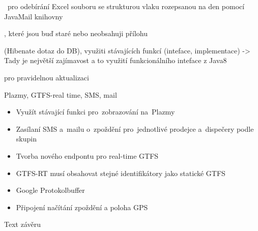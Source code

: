 	
	
~pro odebírání Excel souboru se strukturou vlaku rozepsanou na den
 pomocí JavaMail knihovny
	
	
, které jsou buď staré nebo neobsahuji přílohu
	
	
	
 (Hibenate dotaz do DB), využiti stávajících funkcí
 (inteface, implementace) -> Tady je největší zajímavost a to využití funkcionálního inteface z Java8~\cite{java8}
	
	
 pro pravidelnou aktualizaci
	
	

Plazmy, GTFS-real time, SMS, mail

\begin{itemize}
	\item Využít stávající funkci pro~zobrazování na~Plazmy
	\item Zasílaní SMS a~mailu o~zpoždění pro~jednotlivé prodejce a~dispečery podle skupin
\end{itemize}

\begin{itemize}
	\item Tvorba nového endpontu pro real-time GTFS
	\item GTFS-RT musí obsahovat stejné identifikátory jako statické GTFS
	\item Google Protokolbuffer
	\item Připojení načítání zpoždění a poloha GPS
\end{itemize}

Text závěru


